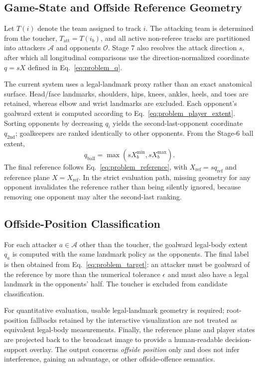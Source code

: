 \documentclass[runningheads]{llncs}
\begin{document}
\subsection{Game-State and Offside Reference Geometry}
\label{subsec:reference}

Let $T(i)$ denote the team assigned to track $i$. The attacking team is determined from the toucher, $T_{\mathrm{att}}=T(i_b)$, and all active non-referee tracks are partitioned into attackers $\mathcal A$ and opponents $\mathcal O$. Stage 7 also resolves the attack direction $s$, after which all longitudinal comparisons use the direction-normalized coordinate $q=sX$ defined in Eq.~\eqref{eq:problem_q}.

The current system uses a legal-landmark proxy rather than an exact anatomical surface. Head/face landmarks, shoulders, hips, knees, ankles, heels, and toes are retained, whereas elbow and wrist landmarks are excluded. Each opponent's goalward extent is computed according to Eq.~\eqref{eq:problem_player_extent}. Sorting opponents by decreasing $q_i$ yields the second-last-opponent coordinate $q_{\mathrm{2nd}}$; goalkeepers are ranked identically to other opponents. From the Stage-6 ball extent,
\begin{equation}
q_{\mathrm{ball}}=
\max\left(sX_b^{\min},sX_b^{\max}\right).
\label{eq:ball_extent}
\end{equation}
The final reference follows Eq.~\eqref{eq:problem_reference}, with $X_{\mathrm{ref}}=s q_{\mathrm{ref}}$ and reference plane $X=X_{\mathrm{ref}}$. In the strict evaluation path, missing geometry for any opponent invalidates the reference rather than being silently ignored, because removing one opponent may alter the second-last ranking.

\subsection{Offside-Position Classification}
\label{subsec:offside_position}

For each attacker $a\in\mathcal A$ other than the toucher, the goalward legal-body extent $q_a$ is computed with the same landmark policy as the opponents. The final label is then obtained from Eq.~\eqref{eq:problem_target}: an attacker must be goalward of the reference by more than the numerical tolerance $\epsilon$ and must also have a legal landmark in the opponents' half. The toucher is excluded from candidate classification.

For quantitative evaluation, usable legal-landmark geometry is required; root-position fallbacks retained by the interactive visualization are not treated as equivalent legal-body measurements. Finally, the reference plane and player states are projected back to the broadcast image to provide a human-readable decision-support overlay. The output concerns \emph{offside position} only and does not infer interference, gaining an advantage, or other offside-offence semantics.
\end{document}
